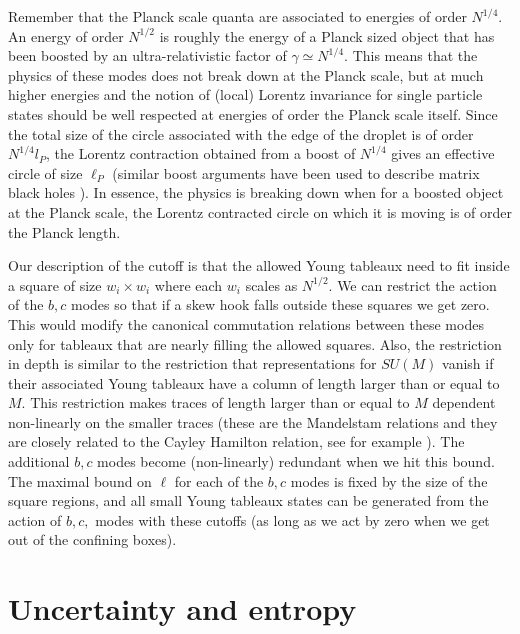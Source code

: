\documentclass[12pt,nofootinbib, longbibliography]{revtex4-1}
\begin{document}
Remember that the Planck scale quanta are associated to  energies of order $N^{1/4}$. An energy of order $N^{1/2}$ is roughly the energy of a Planck sized object that has been boosted by an ultra-relativistic factor of $\gamma\simeq N^{1/4}$. This means that the physics of these modes does not break down at the Planck scale, but at much higher energies and the notion of (local) Lorentz invariance for single particle states should be well respected at energies of order the Planck scale itself. Since the total size of the circle associated with the edge of the droplet is of order $N^{1/4}l_P$,  the Lorentz contraction obtained from a  boost of $N^{1/4}$ gives an effective circle of size $\ell_P$ (similar boost arguments have been used to describe matrix black holes \cite{Banks:1997hz}). In essence, the physics is breaking down when for a boosted object at the Planck scale, the Lorentz contracted circle on which it is moving is of order the Planck length.

Our description of the cutoff is that the allowed Young tableaux need to fit inside a square of size $w_i\times w_i$ where each $w_i$ scales as $N^{1/2}$. We can restrict the action of the $b,c $ modes so that if a skew hook falls outside these squares we get zero.  This would modify the canonical commutation relations between these modes only for tableaux that are nearly filling the allowed squares. Also, the restriction in depth is similar to the restriction that representations for $SU(M)$ vanish if their associated Young tableaux have a column of length larger than or equal to $M$. This restriction makes traces of length larger than or equal to $M$ dependent non-linearly on the smaller traces (these are the Mandelstam relations and they are closely related to the Cayley Hamilton relation, see for example \cite{Berenstein:1993gb}). The additional $b,c$ modes become (non-linearly) redundant when we hit this bound. The maximal bound on $\ell$ for each of the $b,c$ modes is fixed by the size of the square regions, and all small Young tableaux states can be generated from the action of $b,c,$ modes with these cutoffs (as long as we act by zero when we get out of the confining boxes).


\section{Uncertainty and entropy}\label{sec:uncent}
\end{document}
